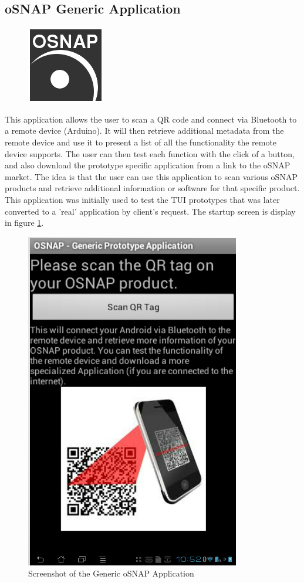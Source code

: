 \subsection{oSNAP Generic Application} \label{section:app-generic}
\begin{figure}
	\centering \includegraphics[scale=0.25]{img/app-generic}
\end{figure}
This application allows the user to scan a QR code and connect via Bluetooth to a remote device (Arduino).
It will then retrieve additional metadata from the remote device and use it to present a list of all the
functionality the remote device supports. The user can then test each function with the click of a button,
and also download the prototype specific application from a link to the oSNAP market.
The idea is that the user can use this application to scan various oSNAP products and retrieve
additional information or software for that specific product. This application was initially used to test
the TUI prototypes that was later converted to a 'real' application by client's request. The startup screen
is display in figure \ref{fig:osnap-generic}.

\begin{figure}[h!]
	\centering \includegraphics[scale=0.4]{img/osnap-generic}
	\caption{Screenshot of the Generic oSNAP Application}
	\label{fig:osnap-generic}
\end{figure}

